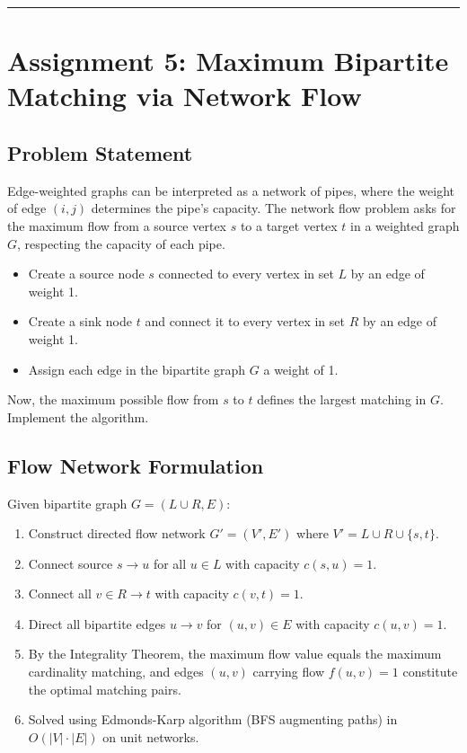 \documentclass[12pt]{article}
\begin{document}
\vspace{0.5cm}
\hrule
\vspace{0.5cm}

\section*{Assignment 5: Maximum Bipartite Matching via Network Flow}

\subsection*{Problem Statement}
Edge-weighted graphs can be interpreted as a network of pipes, where the weight of edge $(i, j)$ determines the pipe's capacity. The network flow problem asks for the maximum flow from a source vertex $s$ to a target vertex $t$ in a weighted graph $G$, respecting the capacity of each pipe.
\begin{itemize}
    \item Create a source node $s$ connected to every vertex in set $L$ by an edge of weight 1.
    \item Create a sink node $t$ and connect it to every vertex in set $R$ by an edge of weight 1.
    \item Assign each edge in the bipartite graph $G$ a weight of 1.
\end{itemize}
Now, the maximum possible flow from $s$ to $t$ defines the largest matching in $G$. Implement the algorithm.

\subsection*{Flow Network Formulation}
Given bipartite graph $G = (L \cup R, E)$:
\begin{enumerate}
    \item Construct directed flow network $G' = (V', E')$ where $V' = L \cup R \cup \{s, t\}$.
    \item Connect source $s \to u$ for all $u \in L$ with capacity $c(s, u) = 1$.
    \item Connect all $v \in R \to t$ with capacity $c(v, t) = 1$.
    \item Direct all bipartite edges $u \to v$ for $(u, v) \in E$ with capacity $c(u, v) = 1$.
    \item By the Integrality Theorem, the maximum flow value equals the maximum cardinality matching, and edges $(u, v)$ carrying flow $f(u, v) = 1$ constitute the optimal matching pairs.
    \item Solved using Edmonds-Karp algorithm (BFS augmenting paths) in $O(|V| \cdot |E|)$ on unit networks.
\end{enumerate}
\end{document}
